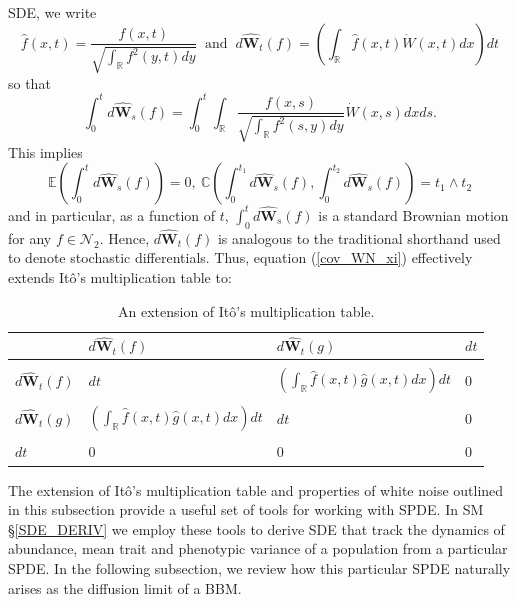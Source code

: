 \documentclass[]{article}
\begin{document}
SDE, we write \begin{equation}
\hat f(x,t)=\frac{f(x,t)}{\sqrt{\int_\mathbb{R}f^2(y,t)dy}} \ \text{ and } \ 
d\hat{\mathbf W}_t(f)=\left(\int_\mathbb{R}\hat f(x,t)\dot W(x,t)dx\right)dt
\end{equation} so that \begin{equation}
\int_0^td\hat{\mathbf W}_s(f)=\int_0^t\int_\mathbb{R}\frac{f(x,s)}{\sqrt{\int_\mathbb{R}f^2(s,y)dy}}\dot W(x,s)dxds.
\end{equation} This implies \begin{equation}
\mathbb{E}\left(\int_0^td\hat{\mathbf W}_s(f)\right)=0, \ \mathbb{C}\left(\int_0^{t_1}d\hat{\mathbf W}_s(f),\int_0^{t_2}d\hat{\mathbf W}_s(f)\right)=t_1\wedge t_2
\end{equation} and in particular, as a function of \(t\),
\(\int_0^td\hat{\mathbf W}_s(f)\) is a standard Brownian motion for any
\(f\in\mathscr{N}_2\). Hence, \(d\hat{\mathbf W}_t(f)\) is analogous to
the traditional shorthand used to denote stochastic differentials. Thus,
equation (\ref{cov_WN_xi}) effectively extends Itô's multiplication
table to:

\begin{table}[H]
\centering\caption{An extension of It\^o's multiplication table.}\vspace{0.2cm}
\begin{tabular}{l|lll}
             & $d\hat{\mathbf W}_t(f)$               & $d\hat{\mathbf W}_t(g)$                & $dt$ \\ \hline
             &                            &                            &      \\
$d\hat{\mathbf W}_t(f)$ & $dt$                       & $\left(\int_\mathbb{R}\hat f(x,t)\hat g(x,t)dx\right)dt$ & $0$  \\
             &                            &                            &      \\
$d\hat{\mathbf W}_t(g)$ & $\left(\int_\mathbb{R}\hat f(x,t)\hat g(x,t)dx\right)dt$ & $dt$                       & $0$  \\
             &                            &                            &      \\
$dt$         & $0$                        & $0$                        & $0$
\end{tabular}\label{mult}
\end{table}

The extension of Itô's multiplication table and properties of white
noise outlined in this subsection provide a useful set of tools for
working with SPDE. In SM \S\ref{SDE_DERIV} we employ these tools to
derive SDE that track the dynamics of abundance, mean trait and
phenotypic variance of a population from a particular SPDE. In the
following subsection, we review how this particular SPDE naturally
arises as the diffusion limit of a BBM.
\end{document}
